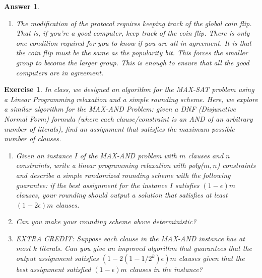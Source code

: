 \documentclass[12pt]{article}
\theoremstyle{colon}
\newtheorem{exercise}{Exercise}
\newtheorem*{answer}{Answer}
\begin{document}
\begin{answer}
\begin{enumerate}[label=\arabic*)]
    \item The modification of the protocol requires keeping track of the global coin flip. That is, if you're a good computer, keep track of the coin flip. There is only one condition required for you to know if you are all in agreement. It is that the coin flip must be the same as the popularity bit. This forces the smaller group to become the larger group. This is enough to ensure that all the good computers are in agreement.
  \end{enumerate}
\end{answer}

\clearpage

\begin{exercise}
  In class, we designed an algorithm for the MAX-SAT problem using a Linear Programming relaxation and a simple rounding scheme. Here, we explore a similar algorithm for the MAX-AND Problem: given a DNF (Disjunctive Normal Form) formula (where each clause/constraint is an AND of an arbitrary number of literals), find an assignment that satisfies the maximum possible number of clauses.

  \begin{enumerate}[label=\alph*)]
    \item Given an instance $I$ of the MAX-AND problem with $m$ clauses and $n$ constraints, write a linear programming relaxation with poly($m,n$) constraints and describe a simple randomized rounding scheme with the following guarantee: if the best assignment for the instance $I$ satisfies $(1-\epsilon)m$ clauses, your rounding should output a solution that satisfies at least $(1-2\epsilon)m$ clauses.

    \item Can you make your rounding scheme above deterministic?

    \item EXTRA CREDIT: Suppose each clause in the MAX-AND instance has at most $k$ literals. Can you give an improved algorithm that guarantees that the output assignment satisfies $(1-2(1-1/2^k)\epsilon)m$ clauses given that the best assignment satisfied $(1-\epsilon)m$ clauses in the instance?
  \end{enumerate}
\end{exercise}
\end{document}
